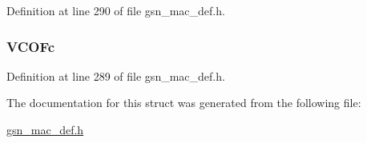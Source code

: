 Definition at line 290 of file gsn\_\-mac\_\-def.h.

\hypertarget{a00118_a3165686ca2c06ae0132dc42c1f4316db}{
\subsubsection[{VCOFc}]{ {\bf VCOFc}}}
\label{a00118_a3165686ca2c06ae0132dc42c1f4316db}


Definition at line 289 of file gsn\_\-mac\_\-def.h.



The documentation for this struct was generated from the following file:\begin{DoxyCompactItemize}
\item 
\hyperlink{a00522}{gsn\_\-mac\_\-def.h}\end{DoxyCompactItemize}
